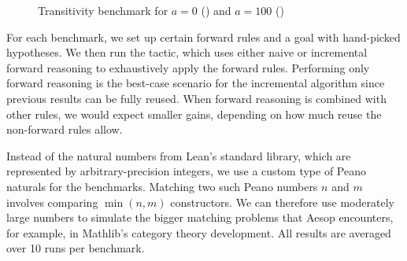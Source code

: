 \begin{figure}%
  \centering
    \caption{Transitivity benchmark for $a = 0$ (\protect\showpgfsquare) and $a = 100$ (\protect\showpgfcircle)}%
    \label{fig:forward:trans}
  \end{figure}

For each benchmark, we set up certain forward rules and a goal with hand-picked hypotheses.
We then run the  tactic, which uses either naive or incremental forward reasoning to exhaustively apply the forward rules.
Performing only forward reasoning is the best-case scenario for the incremental algorithm since previous results can be fully reused.
When forward reasoning is combined with other rules, we would expect smaller gains, depending on how much reuse the non-forward rules allow.

Instead of the natural numbers from Lean's standard library, which are represented by arbitrary-precision integers, we use a custom type of Peano naturals for the benchmarks.
Matching two such Peano numbers $n$ and $m$ involves comparing $\min(n, m)$ constructors.
We can therefore use moderately large numbers to simulate the bigger matching problems that Aesop encounters, for example, in Mathlib's category theory development.
All results are averaged over 10 runs per benchmark.

